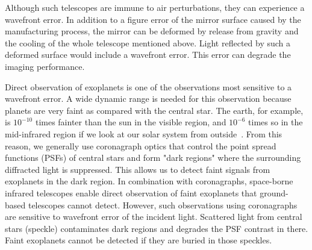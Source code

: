 \documentclass[a4paper]{article}
\begin{document}
\begin{table}[t]
\centering
\caption{\bf Specifications of space-borne infrared telescopes. ($\ast$ in Launch year means just planning.)}
{}
  \label{telescope}
\end{table}

Although such telescopes are immune to air perturbations, they can experience a wavefront error. In addition to a figure error of the mirror surface caused by the manufacturing process, the mirror can be deformed by release from gravity and the cooling of the whole telescope mentioned above. Light reflected by such a deformed surface would include a wavefront error. This error can degrade the imaging performance.

Direct observation of exoplanets is one of the observations most sensitive to a wavefront error. A wide dynamic range is needed for this observation because planets are very faint as compared with the central star. The earth, for example, is $10^{-10}$ times fainter than the sun in the visible region, and $10^{-6}$ times so in the mid-infrared region if we look at our solar system from outside~\cite{Solar_system_contrast}.
From this reason, we generally use coronagraph optics that control the point spread functions (PSFs) of central stars and form "dark regions" where the surrounding diffracted light is suppressed. This allows us to detect faint signals from exoplanets in the dark region. In combination with coronagraphs, space-borne infrared telescopes enable direct observation of faint exoplanets that ground-based telescopes cannot detect. However, such observations using coronagraphs are sensitive to wavefront error of the incident light. Scattered light from central stars (speckle) contaminates dark regions and degrades the PSF contrast in there. Faint exoplanets cannot be detected if they are buried in those speckles.
\end{document}
